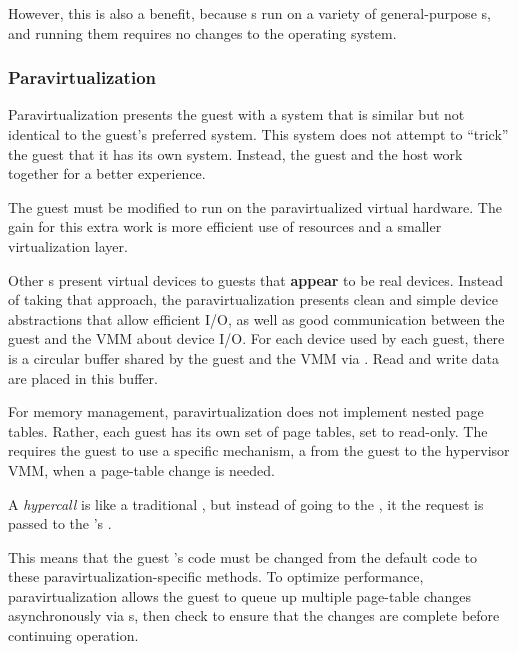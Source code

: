 However, this is also a benefit, because s run on a variety of general-purpose s, and running them requires no changes to the  operating system.

\subsubsection{Paravirtualization}\label{subsubsec:Paravirtualization}
Paravirtualization presents the guest with a system that is similar but not identical to the guest's preferred system.
This system does not attempt to ``trick'' the guest  that it has its own system.
Instead, the guest and the host work together for a better  experience.

The guest must be modified to run on the paravirtualized virtual hardware.
The gain for this extra work is more efficient use of resources and a smaller virtualization layer.

Other s present virtual devices to guests that \textbf{appear} to be real devices.
Instead of taking that approach, the paravirtualization presents clean and simple device abstractions that allow efficient I/O, as well as good communication between the guest and the VMM about device I/O.
For each device used by each guest, there is a circular buffer shared by the guest and the VMM via .
Read and write data are placed in this buffer.

For memory management, paravirtualization does not implement nested page tables.
Rather, each guest has its own set of page tables, set to read-only.
The  requires the guest to use a specific mechanism, a  from the guest to the hypervisor VMM, when a page-table change is needed.

\begin{definition}[Hypercall]\label{def:Hypercall}
  A \emph{hypercall} is like a traditional , but instead of going to the , it the request is passed to the 's .
\end{definition}

This means that the guest 's  code must be changed from the default code to these paravirtualization-specific methods.
To optimize performance, paravirtualization allows the guest to queue up multiple page-table changes asynchronously via s, then check to ensure that the changes are complete before continuing operation.

